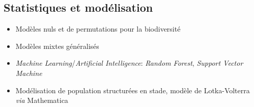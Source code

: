 \documentclass[12pt,a4paper,]{article}
\providecommand{\tightlist}{%
  \setlength{\itemsep}{0pt}\setlength{\parskip}{0pt}}
\begin{document}
\subsection{Statistiques et
modélisation}\label{statistiques-et-moduxe9lisation}

\begin{itemize}
\tightlist
\item
  Modèles nuls et de permutations pour la biodiversité
\item
  Modèles mixtes généralisés
\item
  \emph{Machine Learning}/\emph{Artificial Intelligence}: \emph{Random
  Forest}, \emph{Support Vector Machine}
\item
  Modélisation de population structurées en stade, modèle de
  Lotka-Volterra \emph{via} Mathematica
\end{itemize}
\end{document}
